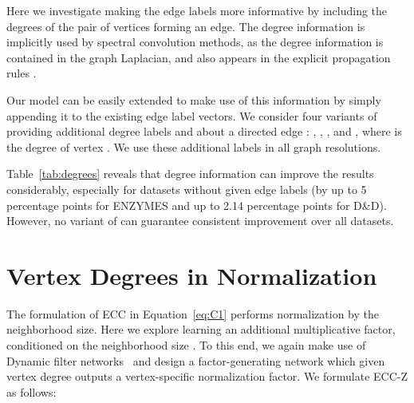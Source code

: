 \documentclass[10pt,twocolumn,letterpaper]{article}
\begin{document}
Here we investigate making the edge labels more informative by including the degrees of the pair of vertices forming an edge. The degree information is implicitly used by spectral convolution methods, as the degree information is contained in the graph Laplacian, and also appears in the explicit propagation rules \cite{kipf, dcnn}. 

Our model can be easily extended to make use of this information by simply appending it to the existing edge label vectors. We consider four variants of providing additional degree labels  and   about a directed edge : , , , and , where  is the degree of vertex . We use these additional labels in all graph resolutions.



Table~\ref{tab:degrees} reveals that degree information can improve the results considerably, especially for datasets without given edge labels (by up to 5 percentage points for ENZYMES and up to 2.14 percentage points for D{\&}D). However, no variant of  can guarantee consistent improvement over all datasets.



\begin{table}[bt]
\centering
{}
\vspace{1ex}
\caption{\label{tab:degrees}
The effect in mean classification accuracy of adding vertex degrees to edge labels (improvements in italics).}
\end{table}



\section{Vertex Degrees in Normalization} \label{sec:normnet}

The formulation of ECC in Equation~\ref{eq:C1} performs normalization by the neighborhood size. Here we explore learning an additional multiplicative factor, conditioned on the neighborhood size . To this end, we again make use of Dynamic filter networks~\cite{dfn16} and design a factor-generating network   which given vertex degree   outputs a vertex-specific normalization factor. We formulate ECC-Z as follows:
\end{document}
